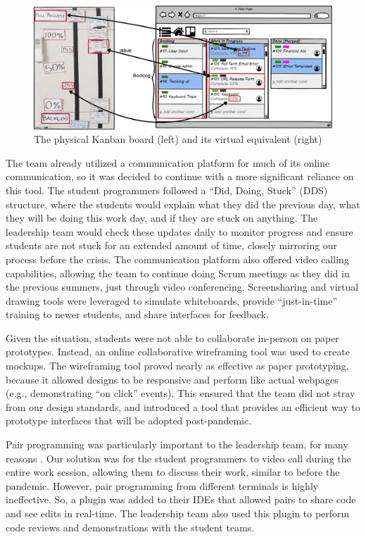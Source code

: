 \begin{figure}[h]
 \centering
 \includegraphics[width=1.0\linewidth]{updatedTrelloKanban.png}
 \caption{The physical Kanban board (left) and its virtual equivalent (right)}
 \label{fig:digitalkanban}
\end{figure}

The team already utilized a communication platform for much of its online communication, so it was decided to continue with a more significant reliance on this tool. The student programmers followed a ``Did, Doing, Stuck'' (DDS) structure, where the students would explain what they did the previous day, what they will be doing this work day, and if they are stuck on anything. The leadership team would check these updates daily to monitor progress and ensure students are not stuck for an extended amount of time, closely mirroring our process before the crisis. The communication platform also offered video calling capabilities, allowing the team to continue doing Scrum meetings as they did in the previous summers, just through video conferencing. Screensharing and virtual drawing tools were leveraged to simulate whiteboards,  provide ``just-in-time'' training to newer students, and share interfaces for feedback.

Given the situation, students were not able to collaborate in-person on paper prototypes. Instead, an online collaborative wireframing tool was used to create mockups. The wireframing tool proved nearly as effective as paper prototyping, because it allowed designs to be responsive and perform like actual webpages (e.g., demonstrating ``on click'' events). This ensured that the team did not stray from our design standards, and introduced a tool that provides an efficient way to prototype interfaces that will be adopted post-pandemic.

Pair programming was particularly important to the leadership team, for many reasons \cite{2002PairProgramming}. Our solution was for the student programmers to video call during the entire work session, allowing them to discuss their work, similar to before the pandemic. However, pair programming from different terminals is highly ineffective. So, a plugin was added to their IDEs that allowed pairs to share code and see edits in real-time. The leadership team also used this plugin to perform code reviews and demonstrations with the student teams.

